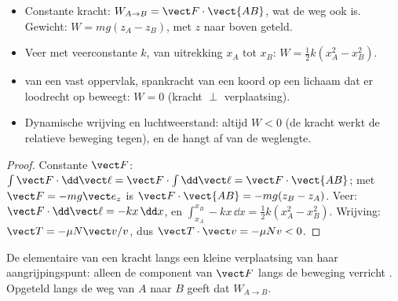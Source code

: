 \begin{proposition}\label{prop:b1:work-and-energy:works}
\begin{itemize}
  \item Constante kracht: $W_{A\to B} = \vect F\cdot\vect{AB}$, wat de
        weg ook is. Gewicht: $W = mg(z_A - z_B)$, met $z$ naar boven geteld.
  \item Veer met veerconstante $k$, van uitrekking $x_A$ tot $x_B$:
        $W = \tfrac12 k(x_A^2 - x_B^2)$.
  \item {} van een vast oppervlak, spankracht van een koord op een lichaam
        dat er loodrecht op beweegt: $W = 0$ (kracht $\perp$ verplaatsing).
  \item Dynamische wrijving en luchtweerstand: altijd $W < 0$ (de kracht werkt de
        relatieve beweging tegen), en de  hangt af van de weglengte.
\end{itemize}
\end{proposition}

\begin{proof}
Constante $\vect F$: $\int\vect F\cdot\dd\vect\ell = \vect F\cdot\int\dd\vect\ell
= \vect F\cdot\vect{AB}$; met $\vect F = -mg\vect e_z$ is $\vect F\cdot\vect{AB}
= -mg(z_B - z_A)$. Veer: $\vect F\cdot\dd\vect\ell = -kx\,\dd x$, en
$\int_{x_A}^{x_B}-kx\,\dd x = \tfrac12 k(x_A^2 - x_B^2)$. Wrijving: $\vect T
= -\mu N\vect v/v$, dus $\vect T\cdot\vect v = -\mu Nv < 0$.
\end{proof}

\begin{omfigure}

{\small De elementaire  van een kracht langs een kleine verplaatsing van
haar aangrijpingspunt: alleen de component van $\vect F$ langs de
beweging verricht . Opgeteld langs de weg van $A$ naar $B$ geeft dat
$W_{A\to B}$.}
\end{omfigure}


